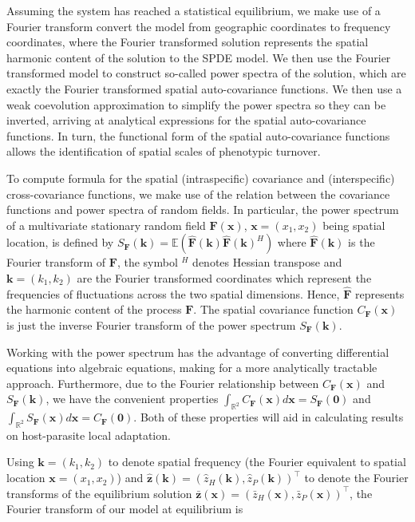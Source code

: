 \documentclass{article}
\begin{document}
Assuming the system has reached a statistical equilibrium, we make use
of a Fourier transform convert the model from geographic coordinates to
frequency coordinates, where the Fourier transformed solution represents
the spatial harmonic content of the solution to the SPDE model. We then
use the Fourier transformed model to construct so-called power spectra
of the solution, which are exactly the Fourier transformed spatial
auto-covariance functions. We then use a weak coevolution approximation
to simplify the power spectra so they can be inverted, arriving at
analytical expressions for the spatial auto-covariance functions. In
turn, the functional form of the spatial auto-covariance functions
allows the identification of spatial scales of phenotypic turnover.

To compute formula for the spatial (intraspecific) covariance and
(interspecific) cross-covariance functions, we make use of the relation
between the covariance functions and power spectra of random fields. In
particular, the power spectrum of a multivariate stationary random field
\(\pmb F(\pmb x)\), \(\pmb x=(x_1,x_2)\) being spatial location, is
defined by
\(S_{\pmb F}(\pmb k)=\mathbb E\left(\hat{\pmb F}(\pmb k)\hat{\pmb F}(\pmb k)^H\right)\)
where \(\hat{\pmb F}(\pmb k)\) is the Fourier transform of \(\pmb F\),
the symbol \(^H\) denotes Hessian transpose and \(\pmb k=(k_1,k_2)\) are
the Fourier transformed coordinates which represent the frequencies of
fluctuations across the two spatial dimensions. Hence, \(\hat{\pmb F}\)
represents the harmonic content of the process \(\pmb F\). The spatial
covariance function \(C_{\pmb F}(\pmb x)\) is just the inverse Fourier
transform of the power spectrum \(S_{\pmb F}(\pmb k)\).

Working with the power spectrum has the advantage of converting
differential equations into algebraic equations, making for a more
analytically tractable approach. Furthermore, due to the Fourier
relationship between \(C_{\pmb F}(\pmb x)\) and \(S_{\pmb F}(\pmb k)\),
we have the convenient properties
\(\int_{\mathbb R^2}C_{\pmb F}(\pmb x)d\pmb x=S_{\pmb F}(\pmb 0)\) and
\(\int_{\mathbb R^2}S_{\pmb F}(\pmb x)d\pmb x=C_{\pmb F}(\pmb 0)\). Both
of these properties will aid in calculating results on host-parasite
local adaptation.

Using \(\pmb k=(k_1,k_2)\) to denote spatial frequency (the Fourier
equivalent to spatial location \(\pmb x=(x_1,x_2)\)) and
\(\hat{\pmb z}(\pmb k)=(\hat z_H(\pmb k),\hat z_P(\pmb k))^\top\) to
denote the Fourier transforms of the equilibrium solution
\(\bar{\pmb z}(\pmb x)=(\bar z_H(\pmb x),\bar z_P(\pmb x))^\top\), the
Fourier transform of our model at equilibrium is
\end{document}

